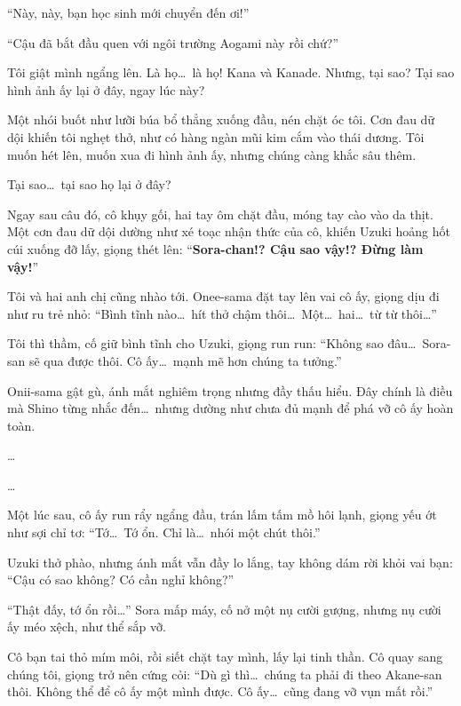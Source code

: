 \documentclass[../main.tex]{subfiles}
\begin{document}
``Này, này, bạn học sinh mới chuyển đến ơi!''

``Cậu đã bắt đầu quen với ngôi trường Aogami này rồi chứ?''

Tôi giật mình ngẩng lên. Là họ\dots\ là họ! Kana và Kanade. Nhưng, tại sao? Tại sao hình ảnh ấy lại ở đây, ngay lúc này?


Một nhói buốt như lưỡi búa bổ thẳng xuống đầu, nén chặt óc tôi. Cơn đau dữ dội khiến tôi nghẹt thở, như có hàng ngàn mũi kim cắm vào thái dương. Tôi muốn hét lên, muốn xua đi hình ảnh ấy, nhưng chúng càng khắc sâu thêm.

Tại sao\dots\ tại sao họ lại ở đây?


Ngay sau câu đó, cô khụy gối, hai tay ôm chặt đầu, móng tay cào vào da thịt. Một cơn đau dữ dội dường như xé toạc nhận thức của cô, khiến Uzuki hoảng hốt cúi xuống đỡ lấy, giọng thét lên: ``\textbf{Sora-chan!? Cậu sao vậy!? Đừng làm vậy!}''

Tôi và hai anh chị cũng nhào tới. Onee-sama đặt tay lên vai cô ấy, giọng dịu đi như ru trẻ nhỏ:
``Bình tĩnh nào\dots\ hít thở chậm thôi\dots\ Một\dots\ hai\dots\ từ từ thôi\dots''

Tôi thì thầm, cố giữ bình tĩnh cho Uzuki, giọng run run: ``Không sao đâu\dots\ Sora-san sẽ qua được thôi. Cô ấy\dots\ mạnh mẽ hơn chúng ta tưởng.''

Onii-sama gật gù, ánh mắt nghiêm trọng nhưng đầy thấu hiểu. Đây chính là điều mà Shino từng nhắc đến\dots\ nhưng dường như chưa đủ mạnh để phá vỡ cô ấy hoàn toàn.

\dots

\dots

Một lúc sau, cô ấy run rẩy ngẩng đầu, trán lấm tấm mồ hôi lạnh, giọng yếu ớt như sợi chỉ tơ: ``Tớ\dots\ Tớ ổn. Chỉ là\dots\ nhói một chút thôi.''

Uzuki thở phào, nhưng ánh mắt vẫn đầy lo lắng, tay không dám rời khỏi vai bạn: ``Cậu có sao không? Có cần nghỉ không?''

``Thật đấy, tớ ổn rồi\dots'' Sora mấp máy, cố nở một nụ cười gượng, nhưng nụ cười ấy méo xệch, như thể sắp vỡ.

Cô bạn tai thỏ mím môi, rồi siết chặt tay mình, lấy lại tinh thần. Cô quay sang chúng tôi, giọng trở nên cứng cỏi: ``Dù gì thì\dots\ chúng ta phải đi theo Akane-san thôi. Không thể để cô ấy một mình được. Cô ấy\dots\ cũng đang vỡ vụn mất rồi.''

\end{document}

